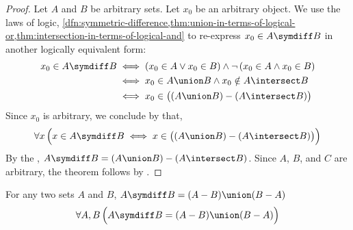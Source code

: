 \begin{proof}
    Let \( A \) and \( B \) be arbitrary sets. Let \( x_{0} \) be an arbitrary object. We use the laws of logic,
    \cref{dfn:symmetric-difference,thm:union-in-terms-of-logical-or,thm:intersection-in-terms-of-logical-and}
    to re-express \( x_{0} \in A \symdiff B \) in another logically equivalent form:
    \begin{align*}
        x_{0} \in A \symdiff B
        &\iff
        \mleft( x_{0} \in A \lor x_{0} \in B \mright)
        \land
        \lnot \, \mleft( x_{0} \in A \land x_{0} \in B \mright) \\
        &\iff
        x_{0} \in A \union B \land x_{0} \notin A \intersect B\\
        &\iff
        x_{0} \in \big( \mleft( A \union B \mright) - \mleft( A \intersect B \mright) \big)
    \end{align*}
    Since \( x_{0} \) is arbitrary, we conclude by  that,
    \begin{equation*}
        \forall x \, \Big( x \in A \symdiff B \iff
        x \in \big( \mleft( A \union B \mright) - \mleft( A \intersect B \mright) \big)\Big)
    \end{equation*}
    By the , \( A \symdiff B = \mleft( A \union B \mright) - \mleft( A \intersect B \mright) \).
    Since \( A \), \( B \), and \( C \) are arbitrary, the theorem follows by .
\end{proof}

\begin{thm}
    \label{set-identities:symmetric-difference-as-the-union-of-differences}
    For any two sets \( A \) and \( B \), \( A \symdiff B = \mleft( A - B \mright) \union \mleft( B - A \mright) \)
    \begin{equation*}
        \forall A,B \, \Big( A \symdiff B = \mleft( A - B \mright) \union \mleft( B - A \mright) \Big)
    \end{equation*}
\end{thm}

